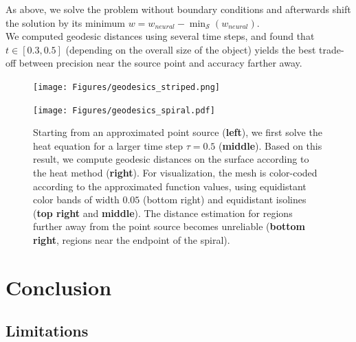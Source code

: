 \documentclass[12pt,openany]{book}
\def\S{\mathcal{S}}
\theoremstyle{plainnormal}
\theoremstyle{remark}
\begin{document}
As above, we solve the problem without boundary conditions and afterwards shift the solution by its minimum $w = w_{neural} - \min_\S(w_{neural}).$\\
We computed geodesic distances using several time steps, and found that \( t \in [0.3, 0.5] \) (depending on the overall size of the object) yields the best trade-off between precision near the source point and accuracy farther away.

\begin{figure}[htbp]
  \centering
  \begin{minipage}[c]{0.45\textwidth}
    \texttt{[image: Figures/geodesics\_striped.png]}
  \end{minipage}%
  \hfill
  \begin{minipage}[c]{0.45\textwidth}
    \label{fig:geodINHeat2}
  \end{minipage}
\end{figure}

\begin{figure}
    \texttt{[image: Figures/geodesics\_spiral.pdf]}
\caption{Starting from an approximated point source (\textbf{left}), we first solve the heat equation for a larger time step $\tau = 0.5$ (\textbf{middle}). Based on this result, we compute geodesic distances on the surface according to the heat method (\textbf{right}). For visualization, the mesh is color-coded according to the approximated function values, using equidistant color bands of width $0.05$ (bottom right) and equidistant isolines (\textbf{top right} and \textbf{middle}). The distance estimation for regions further away from the point source becomes unreliable (\textbf{bottom right}, regions near the endpoint of the spiral).}\label{}
\end{figure}

\clearpage
\chapter{Conclusion}
\begingroup
\let\clearpage\relax
\section{Limitations}
\end{document}
